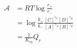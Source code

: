 \begin{eqnarray}\label{eqn:reaction-affinity-ratio}
\mathcal A &= RT\log\frac{r_+}{r_-} \\
& = \log\frac{k_+}{k_-}\frac{[C]^{\gamma_C}[D]^{\gamma_D}}{[A]^{\gamma_A}[B]^{\gamma_B}} \\
& = \frac{1}{K_{eq}}{Q_r} \\
\end{eqnarray}